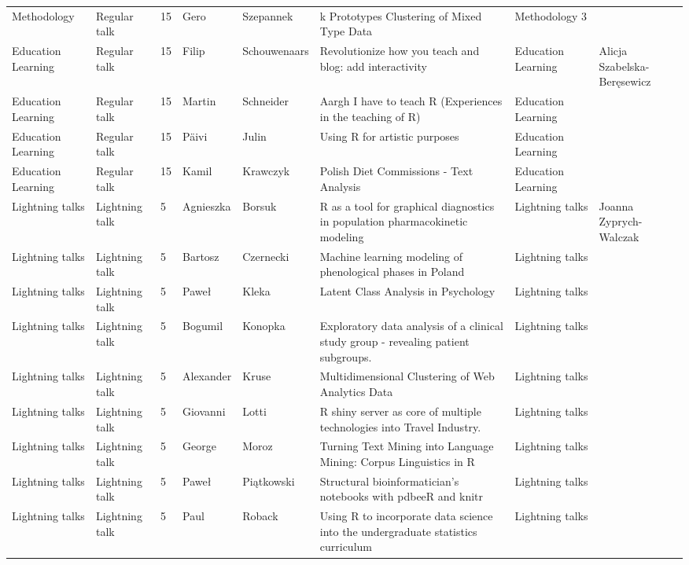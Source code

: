 \begin{longtable}{|p{2.6cm}|p{1.8cm}|p{0.9cm}|p{1.9cm}|p{2.2cm}|p{7cm}|p{2.5cm}|p{2.5cm}|}
  Methodology & Regular talk & 15 & Gero & Szepannek & k Prototypes Clustering of Mixed Type Data & Methodology 3 &  \\ 
  Education Learning & Regular talk & 15 & Filip & Schouwenaars & Revolutionize how you teach and blog: add interactivity & Education Learning & Alicja Szabelska-Beręsewicz \\ 
  Education Learning & Regular talk & 15 & Martin & Schneider & Aargh I have to teach R (Experiences in the teaching of R) & Education Learning &  \\ 
  Education Learning & Regular talk & 15 & Päivi & Julin & Using R for artistic purposes & Education Learning &  \\ 
  Education Learning & Regular talk & 15 & Kamil & Krawczyk & Polish Diet Commissions - Text Analysis & Education Learning &  \\ 
  Lightning talks & Lightning talk & 5 & Agnieszka & Borsuk & R as a tool for graphical diagnostics in population pharmacokinetic modeling & Lightning talks & Joanna Zyprych-Walczak \\ 
  Lightning talks & Lightning talk & 5 & Bartosz & Czernecki & Machine learning modeling of phenological phases in Poland & Lightning talks &  \\ 
  Lightning talks & Lightning talk & 5 & Paweł & Kleka & Latent Class Analysis in Psychology & Lightning talks &  \\ 
  Lightning talks & Lightning talk & 5 & Bogumil & Konopka & Exploratory data analysis of a clinical study group - revealing patient subgroups. & Lightning talks &  \\ 
  Lightning talks & Lightning talk & 5 & Alexander & Kruse & Multidimensional Clustering of Web Analytics Data & Lightning talks &  \\ 
  Lightning talks & Lightning talk & 5 & Giovanni & Lotti & R shiny server as core of multiple technologies into Travel Industry. & Lightning talks &  \\ 
  Lightning talks & Lightning talk & 5 & George & Moroz & Turning Text Mining into Language Mining: Corpus Linguistics in R & Lightning talks &  \\ 
  Lightning talks & Lightning talk & 5 & Paweł & Piątkowski & Structural bioinformatician's notebooks with pdbeeR and knitr & Lightning talks &  \\ 
  Lightning talks & Lightning talk & 5 & Paul & Roback & Using R to incorporate data science into the undergraduate statistics curriculum & Lightning talks &  \\ 

\end{longtable}
